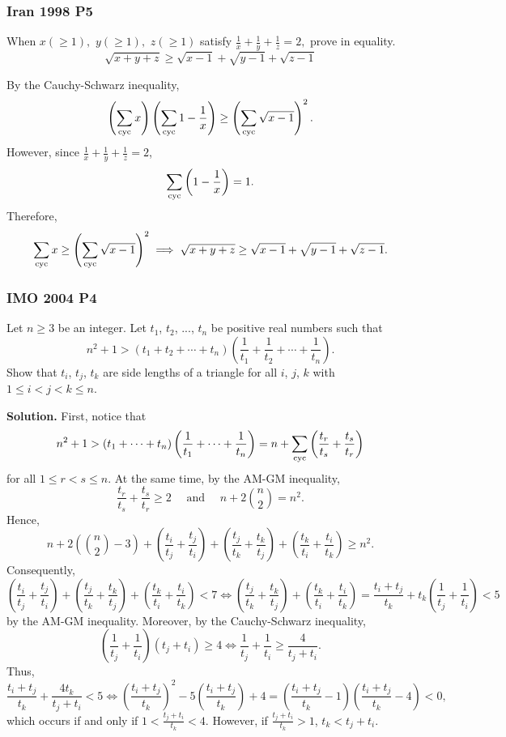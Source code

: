 \clearpage

\subsubsection{Iran 1998 P5}

\begin{problem}
When $x(\ge1),$ $y(\ge1),$ $z(\ge1)$ satisfy $\frac{1}{x}+\frac{1}{y}+\frac{1}{z}=2,$ prove in equality.
$$\sqrt{x+y+z}\ge\sqrt{x-1}+\sqrt{y-1}+\sqrt{z-1}$$
\end{problem}

By the Cauchy-Schwarz inequality,
\[
	\left(\sum_{\text{cyc}} x\right)\left(\sum_{\text{cyc}} 1-\frac{1}{x}\right) \ge \left(\sum_{\text{cyc}} \sqrt{x-1}\right)^2.
\]
However, since $\frac{1}{x}+\frac{1}{y}+\frac{1}{z}=2$,
\[
	\sum_{\text{cyc}} \left(1-\frac{1}{x}\right) = 1.
\]
Therefore,
\[
	\sum_{\text{cyc}} x \ge \left(\sum_{\text{cyc}} \sqrt{x-1}\right)^2 \implies
	\sqrt{x+y+z}\ge\sqrt{x-1}+\sqrt{y-1}+\sqrt{z-1}.
\]

\clearpage

\subsubsection{IMO 2004 P4}

\begin{problem}
Let $n \geq 3$ be an integer. Let $t_1$, $t_2$, ..., $t_n$ be positive real numbers such that\[n^2 + 1 > \left( t_1 + t_2 + \cdots + t_n \right) \left( \frac{1}{t_1} + \frac{1}{t_2} + \cdots + \frac{1}{t_n} \right).\]Show that $t_i$, $t_j$, $t_k$ are side lengths of a triangle for all $i$, $j$, $k$ with $1 \leq i < j < k \leq n$.
\end{problem}
\textbf{\textcolor{color1}{Solution.}} \quad First, notice that
\[
	n^2+1>(t_1+\dots+t_n)\left(\frac{1}{t_1}+\dots+\frac{1}{t_n}\right) = n+ \sum_{\text{cyc}} \left(\frac{t_r}{t_s}+\frac{t_s}{t_r}\right)
\]
for all $1\le r < s \le n$. At the same time, by the AM-GM inequality,
\[
	\frac{t_r}{t_s}+\frac{t_s}{t_r}\ge2 \quad \text{ and } \quad n+2\binom{n}{2}=n^2.
\]
Hence,
\[
	n+ 2\left(\binom{n}{2}-3\right) + \left(\frac{t_i}{t_j}+\frac{t_j}{t_i}\right) + \left(\frac{t_j}{t_k}+\frac{t_k}{t_j}\right) + \left(\frac{t_k}{t_i}+\frac{t_i}{t_k}\right) \ge n^2.
\]
Consequently,
\[
	\left(\frac{t_i}{t_j}+\frac{t_j}{t_i}\right) + \left(\frac{t_j}{t_k}+\frac{t_k}{t_j}\right) + \left(\frac{t_k}{t_i}+\frac{t_i}{t_k}\right)
	< 7 \iff \left(\frac{t_j}{t_k}+\frac{t_k}{t_j}\right) + \left(\frac{t_k}{t_i}+\frac{t_i}{t_k}\right) = \frac{t_i+t_j}{t_k}+t_k\left(\frac{1}{t_j}+\frac{1}{t_i}\right) < 5
\]
by the AM-GM inequality. Moreover, by the Cauchy-Schwarz inequality,
\[
	\left(\frac{1}{t_j}+\frac{1}{t_i}\right)\left(t_j+t_i\right) \ge 4 \iff \frac{1}{t_j}+\frac{1}{t_i} \ge \frac{4}{t_j+t_i}.
\]
Thus,
\[
	\frac{t_i+t_j}{t_k}+\frac{4t_k}{t_j+t_i} < 5 \iff \left(\frac{t_i+t_j}{t_k}\right)^2-5\left(\frac{t_i+t_j}{t_k}\right)+4 = \left(\frac{t_i+t_j}{t_k}-1\right)\left(\frac{t_i+t_j}{t_k}-4\right) < 0,
\]
which occurs if and only if $1<\frac{t_j+t_i}{t_k}<4$. However, if $\frac{t_j+t_i}{t_k}>1$, $t_k<t_j+t_i$.

